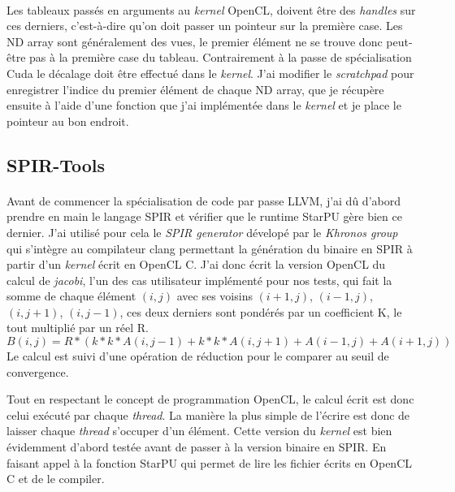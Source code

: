 \paragraph{}
Les tableaux passés en arguments au \emph{kernel} OpenCL, doivent être des
\emph{handles} sur ces derniers, c'est-à-dire qu'on doit passer un pointeur sur
la première case. Les ND array sont généralement des vues, le premier élément ne
se trouve donc peut-être pas à la première case du tableau. Contrairement à la
passe de spécialisation Cuda le décalage doit être effectué dans le
\emph{kernel}. J'ai modifier le \emph{scratchpad} pour enregistrer l'indice du
premier élément de chaque ND array, que je récupère ensuite à l'aide d'une
fonction que j'ai implémentée dans le \emph{kernel} et je place le pointeur au
bon endroit.

\subsection{SPIR-Tools}
\paragraph{}
Avant de commencer la spécialisation de code par passe LLVM, j'ai dû d'abord
prendre en main le langage SPIR et vérifier que le runtime StarPU gère bien ce
dernier. J'ai utilisé pour cela le \emph{SPIR generator} dévelopé par le
\emph{Khronos group}~\cite{spir_clang} qui s'intègre au compilateur clang
permettant la génération du binaire en SPIR à partir d'un \emph{kernel} écrit en
OpenCL C. J'ai donc écrit la version OpenCL du calcul de \emph{jacobi}, l'un des
cas utilisateur implémenté pour nos tests, qui fait la somme de chaque élément
$(i, j)$ avec ses voisins $(i+1, j)$, $(i-1, j)$, $(i, j+1)$, $(i, j-1)$, ces
deux derniers sont pondérés par un coefficient K, le tout multiplié par un réel
R.
\[ B(i, j) = R * ( k*k * A(i, j-1) + k*k * A(i, j+1) + A(i-1, j) + A(i+1, j)) \]
Le calcul est suivi d'une opération de réduction pour le comparer au seuil de
convergence.

Tout en respectant le concept de programmation OpenCL, le calcul écrit est donc
celui exécuté par chaque \emph{thread}. La manière la plus simple de l'écrire
est donc de laisser chaque \emph{thread} s'occuper d'un élément. Cette version
du \emph{kernel} est bien évidemment d'abord testée avant de passer à la version
binaire en SPIR. En faisant appel à la fonction StarPU qui permet de lire les
fichier écrits en OpenCL C et de le compiler.

